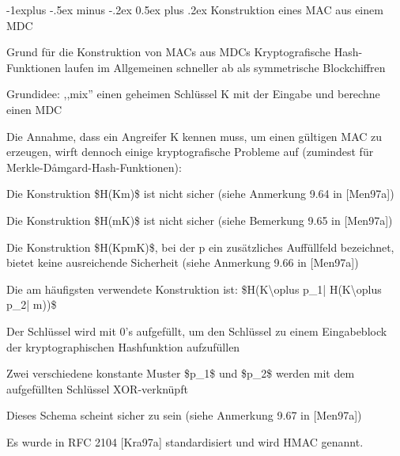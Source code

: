\documentclass[a4paper]{article}
\makeatletter
\renewcommand{\subsection}{\@startsection{subsection}{2}{0mm}%
 {-1explus -.5ex minus -.2ex}%
 {0.5ex plus .2ex}%
 {\normalfont\normalsize\bfseries}}
\makeatother
\begin{document}
\begin{multicols}{3}
      \subsection{Konstruktion eines MAC aus einem
            MDC}

      \begin{itemize*}
            \item Grund für die Konstruktion von MACs aus MDCs Kryptografische
            Hash-Funktionen laufen im Allgemeinen schneller ab als symmetrische
            Blockchiffren
            \item Grundidee: ,,mix'' einen geheimen Schlüssel K mit der Eingabe und
            berechne einen MDC
            \item Die Annahme, dass ein Angreifer K kennen muss, um einen gültigen MAC
            zu erzeugen, wirft dennoch einige kryptografische Probleme auf
            (zumindest für Merkle-Dåmgard-Hash-Funktionen):
            \begin{itemize*}
                  \item Die Konstruktion \$H(K\textbar\textbar m)\$ ist nicht sicher (siehe Anmerkung 9.64 in {[}Men97a{]})
                  \item Die Konstruktion \$H(m\textbar\textbar K)\$ ist nicht sicher (siehe Bemerkung 9.65 in {[}Men97a{]})
                  \item Die Konstruktion \$H(K\textbar\textbar p\textbar\textbar m\textbar\textbar K)\$, bei der p ein zusätzliches Auffüllfeld bezeichnet, bietet keine ausreichende Sicherheit (siehe Anmerkung 9.66 in {[}Men97a{]})
            \end{itemize*}
            \item Die am häufigsten verwendete Konstruktion ist:
            \$H(K\textbackslash oplus p\_1\textbar|
            H(K\textbackslash oplus p\_2\textbar| m))\$
            \begin{itemize*}
                  \item Der Schlüssel wird mit 0's aufgefüllt, um den Schlüssel zu einem Eingabeblock der kryptographischen Hashfunktion aufzufüllen
                  \item Zwei verschiedene konstante Muster \$p\_1\$ und \$p\_2\$ werden mit dem aufgefüllten Schlüssel XOR-verknüpft
                  \item Dieses Schema scheint sicher zu sein (siehe Anmerkung 9.67 in {[}Men97a{]})
                  \item Es wurde in RFC 2104 {[}Kra97a{]} standardisiert und wird HMAC genannt.
            \end{itemize*}
      \end{itemize*}



\end{multicols}
\end{document}
